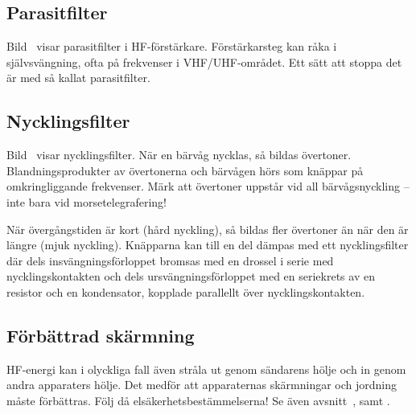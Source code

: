 \subsection{Parasitfilter}

Bild~ visar parasitfilter i HF-förstärkare.
Förstärkarsteg kan råka i självsvängning, ofta på frekvenser i VHF/UHF-området.
Ett sätt att stoppa det är med så kallat parasitfilter.

\subsection{Nycklingsfilter}
\label{Nycklingsfilter}

Bild~ visar nycklingsfilter.
När en bärvåg nycklas, så bildas övertoner.
Blandningsprodukter av övertonerna och bärvågen hörs som knäppar på
omkringliggande frekvenser.
Märk att övertoner uppstår vid all bärvågsnyckling -- inte bara vid
morsetelegrafering!

När övergångstiden är kort (hård nyckling), så bildas fler övertoner
än när den är längre (mjuk nyckling).
Knäpparna kan till en del dämpas med ett nycklingsfilter där dels
insvängningsförloppet bromsas med en drossel i serie med nycklingskontakten och
dels ursvängningsförloppet med en seriekrets av en resistor och en kondensator,
kopplade parallellt över nycklingskontakten.

\subsection{Förbättrad skärmning}

HF-energi kan i olyckliga fall även stråla ut genom sändarens hölje
och in genom andra apparaters hölje.
Det medför att apparaternas skärmningar och jordning måste förbättras.
Följ då elsäkerhetsbestämmelserna!
Se även avsnitt~,  samt
.

